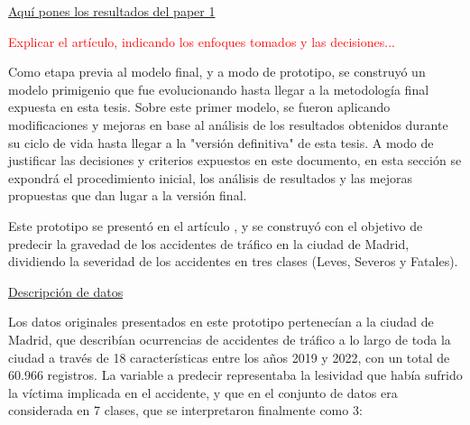 \documentclass{uathesis-es}
\begin{document}
{\underline{Aquí pones los resultados del paper 1}


\textcolor{red}{Explicar el artículo, indicando los enfoques tomados y las decisiones...}

Como etapa previa al modelo final, y a modo de prototipo, se construyó un modelo primigenio que fue evolucionando hasta llegar a la metodología final expuesta en esta tesis. Sobre este primer modelo, se fueron aplicando modificaciones y mejoras en base al análisis de los resultados obtenidos durante su ciclo de vida hasta llegar a la "versión definitiva" de esta tesis. A modo de justificar las decisiones y criterios expuestos en este documento, en esta sección se expondrá el procedimiento inicial, los análisis de resultados y las mejoras propuestas que dan lugar a la versión final.



Este prototipo se presentó en el artículo \cite{PEREZSALA2023113245}, y se construyó con el objetivo de predecir la gravedad de los accidentes de tráfico en la ciudad de Madrid, dividiendo la severidad de los accidentes en tres clases (Leves, Severos y Fatales). 


\underline{Descripción de datos}

Los datos originales presentados en este prototipo pertenecían a la ciudad de Madrid, que describían ocurrencias de accidentes de tráfico a lo largo de toda la ciudad a través de 18 características entre los años 2019 y 2022, con un total de 60.966 registros. La variable a predecir representaba la lesividad que había sufrido la víctima implicada en el accidente, y que en el conjunto de datos era considerada en 7 clases, que se interpretaron finalmente como 3:


}
\end{document}
